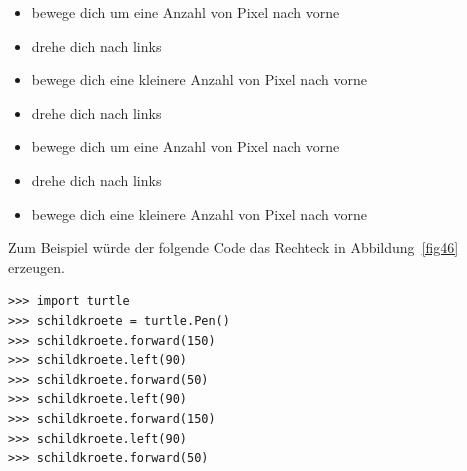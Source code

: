 \begin{itemize}
 \item bewege dich um eine Anzahl von Pixel nach vorne
 \item drehe dich nach links
 \item bewege dich eine kleinere Anzahl von Pixel nach vorne
 \item drehe dich nach links
 \item bewege dich um eine Anzahl von Pixel nach vorne
 \item drehe dich nach links
 \item bewege dich eine kleinere Anzahl von Pixel nach vorne
\end{itemize}
\noindent
Zum Beispiel würde der folgende Code das Rechteck in Abbildung~\ref{fig46} erzeugen.

\begin{Verbatim}[frame=single]
>>> import turtle
>>> schildkroete = turtle.Pen()
>>> schildkroete.forward(150)
>>> schildkroete.left(90)
>>> schildkroete.forward(50)
>>> schildkroete.left(90)
>>> schildkroete.forward(150)
>>> schildkroete.left(90)
>>> schildkroete.forward(50)
\end{Verbatim}

